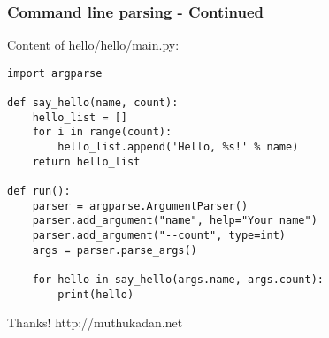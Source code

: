 \documentclass[12pt,handout]{beamer}
\begin{document}
\begin{frame}[fragile]
\frametitle{Command line parsing - Continued}

Content of hello/hello/main.py:

\small{
\begin{verbatim}
import argparse

def say_hello(name, count):
    hello_list = []
    for i in range(count):
        hello_list.append('Hello, %s!' % name)
    return hello_list

def run():
    parser = argparse.ArgumentParser()
    parser.add_argument("name", help="Your name")
    parser.add_argument("--count", type=int)
    args = parser.parse_args()

    for hello in say_hello(args.name, args.count):
        print(hello)

\end{verbatim}
}

\end{frame}

\begin{frame}{Thanks!}
\center http://muthukadan.net
\end{frame}
\end{document}

